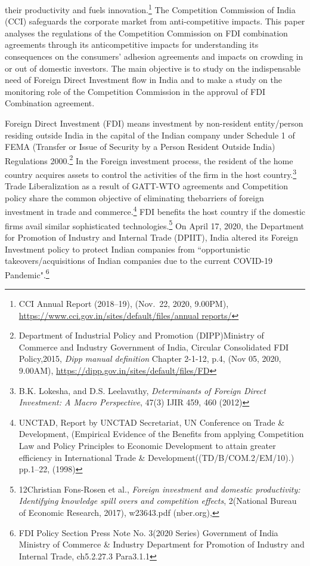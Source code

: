 \begin{multicols}{2}
their productivity and fuels innovation.\footnote{CCI Annual Report (2018--19), (Nov.\ 22, 2020, 9.00PM),
\url{https://www.cci.gov.in/sites/default/files/annual reports/}} The Competition Commission of India (CCI)
safeguards the corporate market from anti-competitive impacts. This paper analyses the
regulations of the Competition Commission on FDI combination agreements through its anticompetitive
impacts for understanding its consequences on the consumers’ adhesion
agreements and impacts on crowding in or out of domestic investors. The main objective is to
study on the indispensable need of Foreign Direct Investment flow in India and to make a
study on the monitoring role of the Competition Commission in the approval of FDI
Combination agreement.
\smallskip


\noi
Foreign Direct Investment (FDI) means investment by non-resident entity/person residing
outside India in the capital of the Indian company under Schedule 1 of FEMA (Transfer or
Issue of Security by a Person Resident Outside India) Regulations 2000.\footnote{Department of Industrial Policy and Promotion (DIPP)Ministry of Commerce and Industry Government of
India, Circular Consolidated FDI Policy,2015, \textit{Dipp manual definition} Chapter 2-1-12, p.4, (Nov 05, 2020, 
9.00AM), \url{https://dipp.gov.in/sites/default/files/FD}} In the Foreign
investment process, the resident of the home country acquires assets to control the activities
of the firm in the host country.\footnote{B.K. Lokesha, and D.S. Leelavathy, \textit{Determinants of Foreign Direct Investment: A Macro Perspective}, 47(3)
IJIR 459, 460 (2012)} Trade Liberalization as a result of GATT-WTO agreements
and Competition policy share the common objective of eliminating the\break barriers of foreign
investment in trade and commerce.\footnote{UNCTAD, Report by UNCTAD Secretariat, UN Conference on Trade \& Development, (Empirical Evidence
of the Benefits from applying Competition Law and Policy Principles to Economic Development to attain
greater efficiency in International Trade \& Development((TD/B/COM.2/EM/10).) pp.1--22, (1998)} FDI benefits the host country if the domestic firms avail
similar sophisticated technologies.\footnote{12Christian Fons-Rosen et al., \textit{Foreign investment and domestic productivity: Identifying knowledge spill overs
and competition effects}, 2(National Bureau of Economic Research, 2017), w23643.pdf (nber.org),} On April 17, 2020, the Department for Promotion of
Industry and Internal Trade (DPIIT), India altered its Foreign Investment policy to protect
Indian companies from ``opportunistic takeovers/acquisitions of Indian companies due to the
current COVID-19 Pandemic".\footnote{FDI Policy Section Press Note No. 3(2020 Series) Government of India Ministry of Commerce \& Industry
Department for Promotion of Industry and Internal Trade, ch5.2.27.3 Para3.1.1}
\smallskip


\end{multicols}

